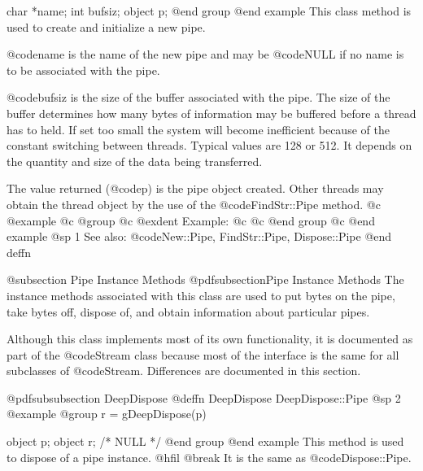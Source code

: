 char    *name;
int     bufsiz;
object  p;
@end group
@end example
This class method is used to create and initialize a new pipe.

@code{name} is the name of the new pipe and may be @code{NULL} if
no name is to be associated with the pipe.

@code{bufsiz} is the size of the buffer associated with the pipe.  The
size of the buffer determines how many bytes of information may be
buffered before a thread has to held.  If set too small the system will
become inefficient because of the constant switching between threads.
Typical values are 128 or 512.  It depends on the quantity and size of
the data being transferred.

The value returned (@code{p}) is the pipe object created.  Other
threads may obtain the thread object by the use of the @code{FindStr::Pipe}
method.  
@c @example
@c @group
@c @exdent Example:
@c 
@c @end group
@c @end example
@sp 1
See also:  @code{New::Pipe, FindStr::Pipe, Dispose::Pipe}
@end deffn



















@subsection Pipe Instance Methods
@pdfsubsection{Pipe Instance Methods}
The instance methods associated with this class are used to put bytes
on the pipe, take bytes off, dispose of, and obtain information
about particular pipes.

Although this class implements most of its own functionality, it is
documented as part of the @code{Stream} class because most of the
interface is the same for all subclasses of @code{Stream}.  Differences
are documented in this section.













@pdfsubsubsection {DeepDispose}
@deffn {DeepDispose} DeepDispose::Pipe
@sp 2
@example
@group
r = gDeepDispose(p)

object  p;
object  r;     /*  NULL  */
@end group
@end example
This method is used to dispose of a pipe instance.  
@hfil @break It is the same as @code{Dispose::Pipe}.


